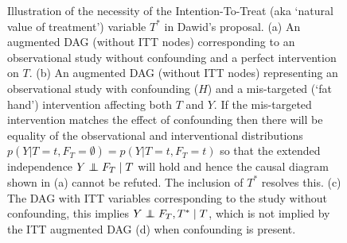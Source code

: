\documentclass[11pt]{article}
\newcommand\indep{\protect\mathpalette{\protect\independenT}{\perp}}
\def\independenT#1#2{\mathrel{\rlap{$#1#2$}\mkern2.5mu{#1#2}}}
\begin{document}
{\begin{figure}
\caption{Illustration of the necessity of the Intention-To-Treat (aka `natural value of treatment') variable $T^*$ in Dawid's proposal.
(a) An augmented DAG (without ITT nodes) corresponding to an observational study without confounding and a perfect intervention on $T$.
(b) An augmented DAG (without ITT nodes) representing an observational study with confounding ($H$) and a mis-targeted (`fat hand') intervention  affecting both $T$ and $Y$.
 If the mis-targeted intervention matches the effect of confounding then there will be equality of the observational and interventional distributions $p(Y|T=t, F_T=\emptyset) = p(Y|T=t, F_T=t)$ so that the extended independence $Y \indep F_T \mid T$ will hold and hence the causal diagram shown in (a) cannot be refuted. The inclusion of $T^*$ resolves this. (c) The DAG with ITT variables corresponding to the study without confounding, this implies $Y \indep F_T, T^* \mid T$, which is not implied by the ITT augmented DAG (d) when confounding is present.
 \label{fig:coincidence}
}
\end{figure}


}
\end{document}
